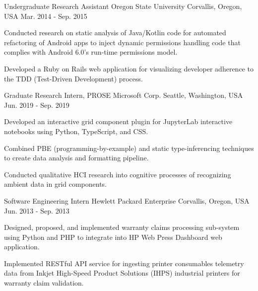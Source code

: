 \begin{cventries}
  \cventry
    {Undergraduate Research Assistant} %
    {Oregon State University} %
    {Corvallis, Oregon, USA} %
    {Mar. 2014 - Sep. 2015} %
    {
      \begin{cvitems} %
        \item {Conducted research on static analysis of Java/Kotlin code for automated refactoring of Android apps to inject dynamic permissions handling code that complies with Android 6.0's run-time permissions model.}
    	\item {Developed a Ruby on Rails web application for visualizing developer adherence to the TDD (Test-Driven Development) process.}
      \end{cvitems}
    }

  \cventry
    {Graduate Research Intern, PROSE} %
    {Microsoft Corp.} %
    {Seattle, Washington, USA} %
    {Jun. 2019 - Sep. 2019} %
    {
   	  \begin{cvitems} %
        \item {Developed an interactive grid component plugin for JupyterLab interactive notebooks using Python, TypeScript, and CSS.}
        \item {Combined PBE (programming-by-example) and static type-inferencing techniques to create data analysis and formatting pipeline.}
        \item {Conducted qualitative HCI research into cognitive processes of recognizing ambient data in grid components.}
      \end{cvitems}
    }
    
  \cventry
    {Software Engineering Intern} %
    {Hewlett Packard Enterprise} %
    {Corvallis, Oregon, USA} %
    {Jun. 2013 - Sep. 2013} %
    {
      \begin{cvitems} %
        \item {Designed, proposed, and implemented warranty claims processing sub-system using Python and PHP to integrate into HP Web Press Dashboard web application.}
        \item {Implemented RESTful API service for ingesting printer consumables telemetry data from Inkjet High-Speed Product Solutions (IHPS) industrial printers for warranty claim validation.}
      \end{cvitems}
    }


\end{cventries}
